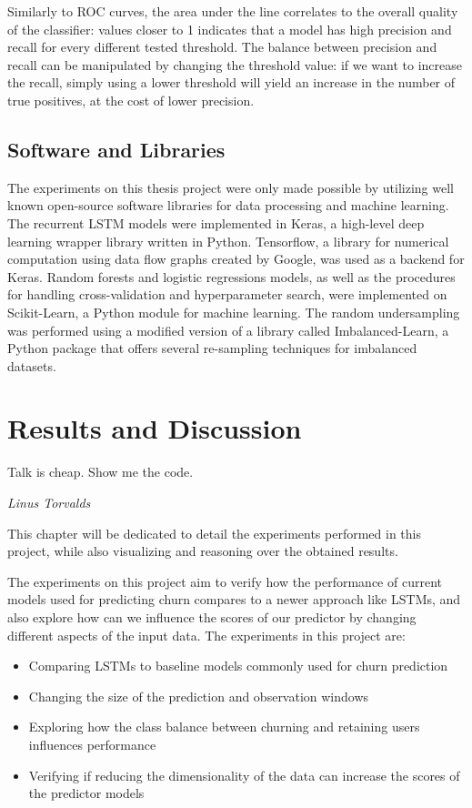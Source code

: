 \documentclass{kththesis}
\begin{document}
Similarly to ROC curves, the area under the line correlates to the overall quality of the classifier: values closer to 1 indicates that a model has high precision and recall for every different tested threshold.  The balance between precision and recall can be manipulated by changing the threshold value: if we want to increase the recall, simply using a lower threshold will yield an increase in the number of true positives, at the cost of lower precision.

\section{Software and Libraries}

The experiments on this thesis project were only made possible by utilizing well known open-source software libraries for data processing and machine learning. The recurrent LSTM models were implemented in Keras\citep{chollet2015keras}, a high-level deep learning wrapper library written in Python.  Tensorflow\citep{abadi2016tensorflow}, a library for numerical computation using data flow graphs created by Google, was used as a backend for Keras. Random forests and logistic regressions models, as well as  the procedures for handling cross-validation and hyperparameter search, were implemented on Scikit-Learn\citep{scikit-learn}, a Python module for machine learning. The random undersampling was performed using a modified version of a library called Imbalanced-Learn\citep{lema2017imbalanced}, a Python package that offers several re-sampling techniques for imbalanced datasets. 

\chapter{Results and Discussion}
\label{cha:results}

\epigraph{Talk is cheap. Show me the code.}{\textit{Linus Torvalds}}

This chapter will be dedicated to detail the experiments performed in this project, while also visualizing and reasoning over the obtained results.

The experiments on this project aim to verify how the performance of current models used for predicting churn compares to a newer approach like LSTMs, and also explore how can we influence the scores of our predictor by changing different aspects of the input data. The experiments in this project are:

\begin{itemize}
\item Comparing LSTMs to baseline models commonly used for churn prediction
\item Changing the size of the prediction and observation windows
\item Exploring how the class balance between churning and retaining users influences performance
\item Verifying if reducing the dimensionality of the data can increase the scores of the predictor models 
\end{itemize}
\end{document}
